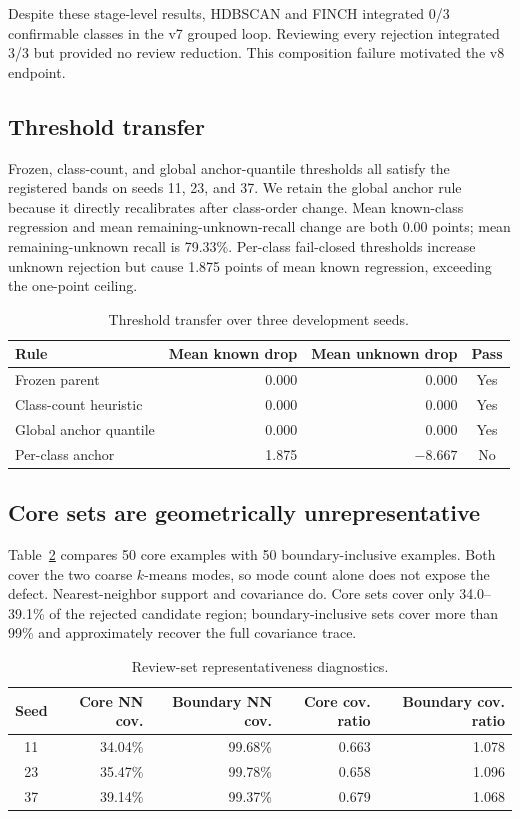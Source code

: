 \documentclass[10pt]{article}
\begin{document}
Despite these stage-level results, HDBSCAN and FINCH integrated 0/3
confirmable classes in the v7 grouped loop. Reviewing every rejection
integrated 3/3 but provided no review reduction. This composition failure
motivated the v8 endpoint.

\subsection{Threshold transfer}

Frozen, class-count, and global anchor-quantile thresholds all satisfy the
registered bands on seeds 11, 23, and 37. We retain the global anchor rule
because it directly recalibrates after class-order change. Mean known-class
regression and mean remaining-unknown-recall change are both 0.00 points; mean
remaining-unknown recall is 79.33\%. Per-class fail-closed thresholds increase
unknown rejection but cause 1.875 points of mean known regression, exceeding
the one-point ceiling.

\begin{table}[t]
\centering
\caption{Threshold transfer over three development seeds.}
\label{tab:threshold}
\begin{tabular}{lrrc}
\toprule
Rule & Mean known drop & Mean unknown drop & Pass \\
\midrule
Frozen parent & 0.000 & 0.000 & Yes \\
Class-count heuristic & 0.000 & 0.000 & Yes \\
Global anchor quantile & 0.000 & 0.000 & Yes \\
Per-class anchor & 1.875 & $-8.667$ & No \\
\bottomrule
\end{tabular}
\end{table}

\subsection{Core sets are geometrically unrepresentative}

Table~\ref{tab:coverage} compares 50 core examples with 50
boundary-inclusive examples. Both cover the two coarse $k$-means modes, so
mode count alone does not expose the defect. Nearest-neighbor support and
covariance do. Core sets cover only 34.0--39.1\% of the rejected candidate
region; boundary-inclusive sets cover more than 99\% and approximately recover
the full covariance trace.

\begin{table}[t]
\centering
\caption{Review-set representativeness diagnostics.}
\label{tab:coverage}
\begin{tabular}{crrrr}
\toprule
Seed & Core NN cov. & Boundary NN cov. & Core cov. ratio & Boundary cov. ratio \\
\midrule
11 & 34.04\% & 99.68\% & 0.663 & 1.078 \\
23 & 35.47\% & 99.78\% & 0.658 & 1.096 \\
37 & 39.14\% & 99.37\% & 0.679 & 1.068 \\
\bottomrule
\end{tabular}
\end{table}
\end{document}
